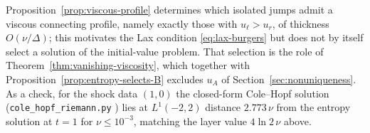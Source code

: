 Proposition~\ref{prop:viscous-profile} determines which isolated jumps admit a
viscous connecting profile, namely exactly those with $u_\ell>u_r$, of thickness
$O(\nu/\Delta)$; this motivates the Lax condition \eqref{eq:lax-burgers} but does
not by itself select a solution of the initial-value problem. That selection is the
role of Theorem~\ref{thm:vanishing-viscosity}, which together with
Proposition~\ref{prop:entropy-selects-B} excludes $u_A$ of
Section~\ref{sec:nonuniqueness}. As a check, for the shock data $(1,0)$ the
closed-form Cole--Hopf solution (\texttt{cole\_hopf\_riemann.py} \cite{code}) lies at
$L^1(-2,2)$ distance $2.773\,\nu$ from the entropy solution at $t=1$ for
$\nu\le10^{-3}$, matching the layer value $4\ln2\,\nu$ above.